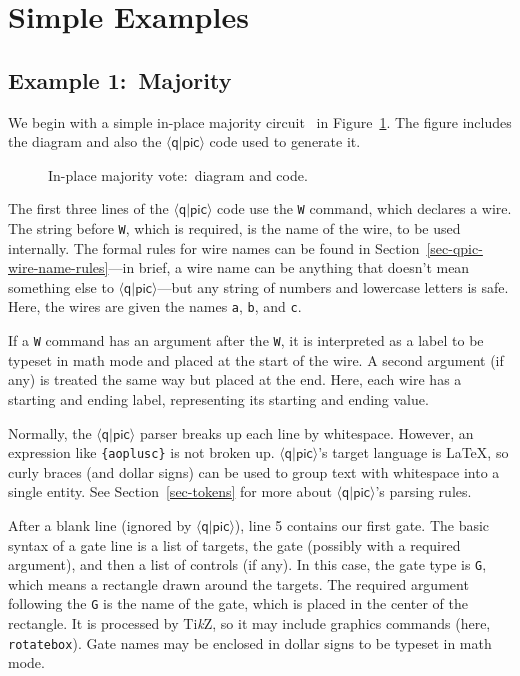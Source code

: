 \documentclass[twoside,12pt]{article}
\newcommand{\qpic}{$\langle\mathsf{q}|\mathsf{pic}\rangle$\xspace}
\newcommand{\TikZ}{Ti\emph{k}Z\xspace}
\begin{document}
\section{Simple Examples}
\label{sec-example}
\subsection{Example 1:\ Majority}
\label{sec-example-maj}
We begin with a simple in-place majority circuit~\cite{CDKM} in Figure~\ref{fig-maj}.  The figure includes the diagram and also the \qpic code used to generate it.
\begin{figure}[h!]
\begin{center}


\begin{minipage}{2in}

\end{minipage}
\end{center}
\caption{In-place majority vote:\ diagram and code.}
\label{fig-maj}
\end{figure}

The first three lines of the \qpic code use the {\tt W} command, which declares a wire.  The string before {\tt W}, which is required, is the name of the wire, to be used internally.  The formal rules for wire names can be found in
Section~\ref{sec-qpic-wire-name-rules}---in brief, a wire name can be anything that doesn't mean something else to \qpic---but any string of numbers and lowercase
letters is safe.  Here, the wires are given the names {\tt a}, {\tt b}, and
{\tt c}.


If a {\tt W} command has an argument after the {\tt W}, it is interpreted as a label to be
typeset in math mode and placed at the start of the wire.  A second argument (if any) is treated the same way but placed at the end.  Here, each wire has a starting and ending label, representing its starting and ending value.


Normally, the \qpic parser breaks up each line by whitespace.  However,
an expression like {\tt \{a{\textvisiblespace}{}oplus{\textvisiblespace}c\}} is not
broken up.  \qpic's target language is {\LaTeX}, so curly
braces (and dollar signs) can be used to group text with whitespace into
a single entity.  See Section~\ref{sec-tokens} for more about \qpic's parsing
rules.


After a blank line (ignored by \qpic), line 5 contains our first gate.
The basic syntax of a gate line is a list of targets, the gate (possibly
with a required argument), and then a list of controls (if any).  In this case,
the gate type is {\tt G}, which means a rectangle drawn around the targets.
The required argument following the {\tt G} is the name of the gate, which
is placed in the center of the rectangle.  It is processed by \TikZ, so it
may include graphics commands (here, {\tt {}rotatebox}).  Gate names
may be enclosed in dollar signs to be typeset in math mode.
\end{document}
